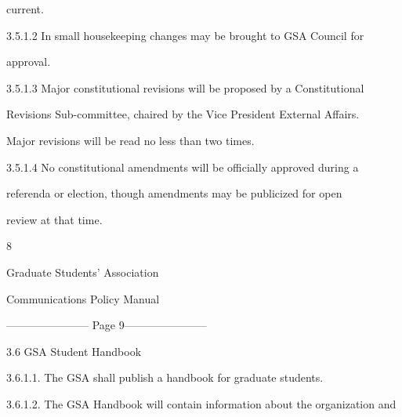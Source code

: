          current.   



3.5.1.2           In small housekeeping changes may be brought to  GSA  Council for  



         approval.   



3.5.1.3           Major  constitutional  revisions  will  be  proposed  by  a  Constitutional  



         Revisions  Sub-committee,  chaired  by  the  Vice  President  External  Affairs.  



         Major revisions will be read no less than two times.   



3.5.1.4           No  constitutional  amendments  will  be  officially  approved  during  a  



         referenda  or  election,  though  amendments  may  be  publicized  for  open  



         review at that time.   



  

  

  

  



                                                      8  

                                      

                                    Graduate Students’ Association  

                                   Communications Policy Manual  

  


----------------------- Page 9-----------------------

                          3.6      GSA Student Handbook  

  



3.6.1.1.     The GSA shall publish a handbook for graduate students.   



3.6.1.2.     The GSA Handbook will contain information about the organization and  



